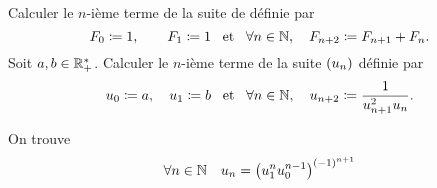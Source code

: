 \documentclass{magnoliaold}
\begin{document}
\begin{preuve}




\end{preuve}


\begin{exos}
\exo Calculer le $n$-ième terme de la suite de  définie par
  \[F_0\coloneqq 1, \qquad F_1\coloneqq 1 \quad\!\text{et}\quad\! \forall n\in\mathbb{N} ,\quad F_{n+2}\coloneqq F_{n+1}+F_n.\]
\exo Soit $a,b\in\mathbb{R}_+^*$. Calculer le $n$-ième terme de la suite $\left(u_n\right)$ définie par
  \[u_0\coloneqq a, \quad u_1\coloneqq b \quad\!\text{et}\quad\! \forall n\in\mathbb{N} ,\quad u_{n+2}\coloneqq\frac{1}{u_{n+1}^2u_n}.\]
  \begin{sol}
  On trouve
  \[\forall n\in\mathbb{N} \quad u_n=\left(u_1^n u_0^{n-1}\right)^{\left(-1\right)^{n+1}}\]
  \end{sol}
\end{exos}
\end{document}
